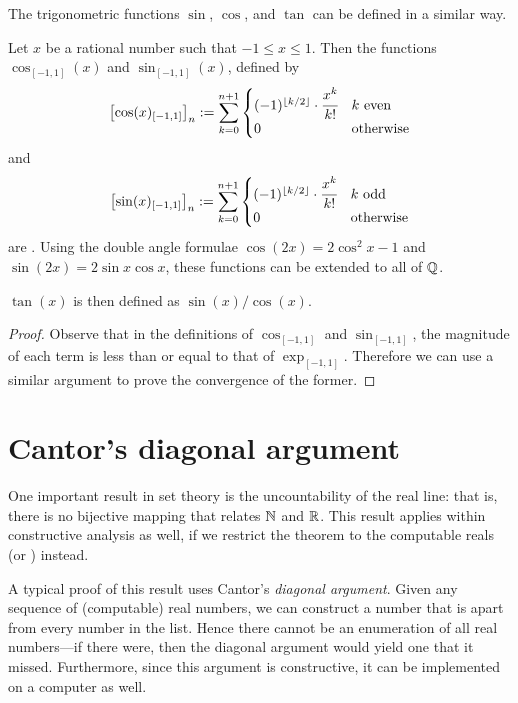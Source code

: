 \documentclass[leqno]{report}
\begin{document}
The trigonometric functions $\sin$, $\cos$, and $\tan$ can be defined in a similar way.

\begin{Proposition}
    Let $x$ be a rational number such that $-1 \leq x \leq 1$. Then the functions $\cos_{[-1,1]}(x)$ and $\sin_{[-1,1]}(x)$, defined by
    \[
        \left[\cos(x)_{[-1,1]}\right]_n
        := \sum_{k=0}^{n+1} \begin{cases}
            (-1)^{\floor{k/2}} \cdot \cfrac{x^k}{k!} & k\ \mathrm{even} \\
            0 & \mathrm{otherwise}
        \end{cases}
    \]
    and
    \[
        \left[\sin(x)_{[-1,1]}\right]_n
        := \sum_{k=0}^{n+1} \begin{cases}
            (-1)^{\floor{k/2}} \cdot \cfrac{x^k}{k!} & k\ \mathrm{odd} \\
            0 & \mathrm{otherwise}
        \end{cases}
    \]
    are \FCCS. Using the double angle formulae $\cos(2x) = 2 \cos^2 x - 1$ and $\sin(2x) = 2 \sin x \cos x$, these functions can be extended to all of $\mathbb{Q}$.

    $\tan(x)$ is then defined as $\sin(x) / \cos(x)$.
\end{Proposition}

\begin{proof}
    Observe that in the definitions of $\cos_{[-1,1]}$ and $\sin_{[-1,1]}$, the magnitude of each term is less than or equal to that of $\exp_{[-1,1]}$. Therefore we can use a similar argument to prove the convergence of the former.
\end{proof}

\section{Cantor's diagonal argument}

One important result in set theory is the uncountability of the real line: that is, there is no bijective mapping that relates $\mathbb{N}$ and $\mathbb{R}$. This result applies within constructive analysis as well, if we restrict the theorem to the computable reals (or \FCCS) instead.

A typical proof of this result uses Cantor's \textit{diagonal argument}. Given any sequence of (computable) real numbers, we can construct a number that is apart from every number in the list. Hence there cannot be an enumeration of all real numbers---if there were, then the diagonal argument would yield one that it missed. Furthermore, since this argument is constructive, it can be implemented on a computer as well.
\end{document}
